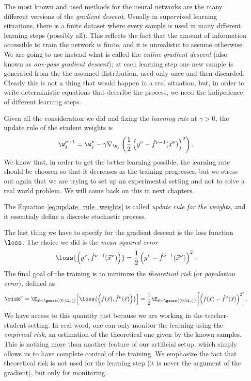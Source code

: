 The most known and used methods for the neural networks are the many different 
versions of the \emph{gradient descent}. Usually in supervised learning situations,
there is a finite dataset where every sample is used in many different learning
steps (possibly all). This reflects the fact that the amount of information accessible
to train the network is finite, and it is unrealistic to assume otherwise.
We are going to use instead what is called the \emph{online gradient descent}
(also known as \emph{one-pass gradient descent}); at each learning step one new sample
is generated from the the assumed distribution, used only once and then discarded.
Clearly this is not a thing that would happen in a real situation, but, in order 
to write deterministic equations that describe the process, we need the indipedence
of different learning steps.

Given all the consideration we did and fixing the \emph{learning rate} at \(\gamma>0\),
the update rule of the student weights is
\begin{equation} \label{eq:update_rule_weights}
  \w^{\nu+1}_j = \w^{\nu}_j - \gamma \nabla_{\w_j}\left(\frac{1}{2}\left(y^\nu-\hat{f}^{\nu-1}{\left(\vec{x}^\nu\right)}\right)^2\right).
\end{equation}
We know that, in order to get the better learning possible, the learning rate should
be choosen so that it decreases as the training progresses, but
we stress out again that we are trying to set up an experimental setting and not 
to solve a real world problem. We will come back on this in next chapters.

The Equation \eqref{eq:update_rule_weights} is called \emph{update rule for the weights},
and it essentialy define a discrete stochastic process. %

The last thing we have to specify for the gradient descent is the loss function \(\loss\).
The choice we did is the \emph{mean squared error}
\[
  \loss{\left(y^\nu,\hat{f}^{\nu-1}{\left(\vec{x}^\nu\right)}\right)} = \frac{1}{2}\left(y^\nu-\hat{f}^{\nu-1}{\left(\vec{x}^\nu\right)}\right)^2.
\]
The final goal of the training is to minimize the \emph{theoretical risk}
(or \emph{population error}), defined as
\begin{equation} \label{eq:theoretical_risk_definition}
  \risk^{\nu} = \E_{\vec{x}\sim\gauss{(0,\I_d)}}{
  \left[\loss{\left(f{\left(\vec{x}\right)},\hat{f}^\nu{\left(\vec{x}\right)}\right)}\right]}=
  \frac{1}{2}\E_{\vec{x}\sim\gauss{(0,\I_d)}}{\left[\left(f{\left(\vec{x}\right)}-\hat{f}^{\nu}{\left(\vec{x}\right)}\right)^2\right]}.
\end{equation}
We have access to this quantity just because we are working in the teacher-student setting.
In real word, one can only monitor the learning using the \emph{empirical risk}, an estimation
of the theoretical one given by the known samples.
This is nothing more than another feature of our artificial setup,
which simply allows us to have complete control of the training.
We emphasize the fact that theoretical risk is not used for the learning step
(it is never the argument of the gradient), but only for monitoring.





